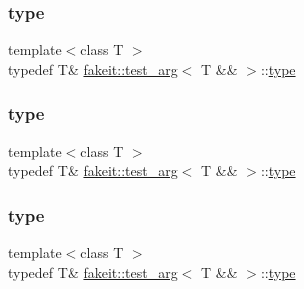 \subsubsection{\texorpdfstring{type}{type}\hspace{0.1cm}{\footnotesize\ttfamily [4/9]}}
{\footnotesize\ttfamily template$<$class T $>$ \\
typedef T\& \mbox{\hyperlink{structfakeit_1_1test__arg}{fakeit\+::test\+\_\+arg}}$<$ T \&\& $>$\+::\mbox{\hyperlink{structfakeit_1_1test__arg_3_01T_01_6_6_01_4_aaace2782c3dd97bd31e137f8c7c47f5f}{type}}}

\mbox{\label{structfakeit_1_1test__arg_3_01T_01_6_6_01_4_aaace2782c3dd97bd31e137f8c7c47f5f}} 
\subsubsection{\texorpdfstring{type}{type}\hspace{0.1cm}{\footnotesize\ttfamily [5/9]}}
{\footnotesize\ttfamily template$<$class T $>$ \\
typedef T\& \mbox{\hyperlink{structfakeit_1_1test__arg}{fakeit\+::test\+\_\+arg}}$<$ T \&\& $>$\+::\mbox{\hyperlink{structfakeit_1_1test__arg_3_01T_01_6_6_01_4_aaace2782c3dd97bd31e137f8c7c47f5f}{type}}}

\mbox{\label{structfakeit_1_1test__arg_3_01T_01_6_6_01_4_aaace2782c3dd97bd31e137f8c7c47f5f}} 
\subsubsection{\texorpdfstring{type}{type}\hspace{0.1cm}{\footnotesize\ttfamily [6/9]}}
{\footnotesize\ttfamily template$<$class T $>$ \\
typedef T\& \mbox{\hyperlink{structfakeit_1_1test__arg}{fakeit\+::test\+\_\+arg}}$<$ T \&\& $>$\+::\mbox{\hyperlink{structfakeit_1_1test__arg_3_01T_01_6_6_01_4_aaace2782c3dd97bd31e137f8c7c47f5f}{type}}}

\mbox{\label{structfakeit_1_1test__arg_3_01T_01_6_6_01_4_aaace2782c3dd97bd31e137f8c7c47f5f}} 
